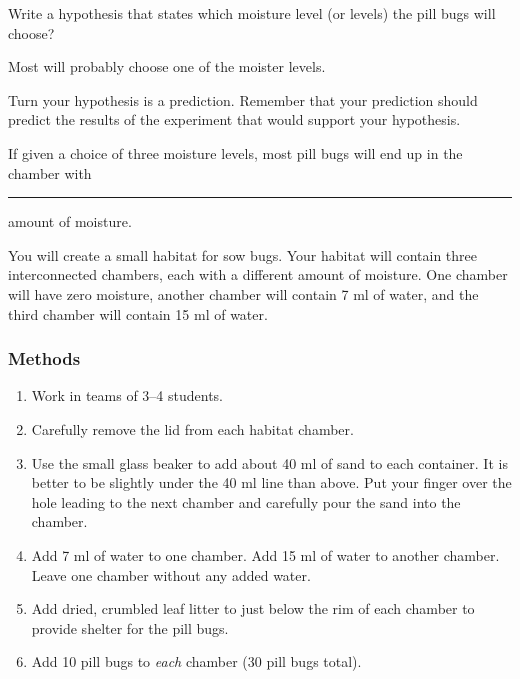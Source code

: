 \documentclass[12pt, hidelinks]{exam}
\newcommand*\AnswerBox[2]{%
    \parbox[t][#1]{0.92\textwidth}{%
    \begin{solution}#2\end{solution}}
    \vspace{\stretch{1}}
}
\newlength{\basespace}
\begin{document}
\begin{questions}

\question \label{ques:hypothesis}
Write a hypothesis that states which moisture level (or levels) the pill bugs will choose?

\AnswerBox{0.35\basespace}{Most will probably choose one of the moister levels.}


\question
Turn your hypothesis is a prediction. Remember that your prediction should predict the results of the experiment that would support your hypothesis. 

\AnswerBox{0.35\basespace}{%
	If given a choice of three moisture levels, most pill bugs will end up in the chamber with \rule{0.75in}{0.4pt} amount of moisture.
}

You will create a small habitat for sow bugs.  Your habitat will contain three interconnected chambers, each with a different amount of moisture.  One chamber will have zero moisture, another chamber will contain 7 ml of water, and the third chamber will contain 15 ml of water.


\subsubsection*{Methods}

\begin{enumerate}
	
	\item Work in teams of 3–4 students.
	
	\item Carefully remove the lid from each habitat chamber. 
	
	\item Use the small glass beaker to add about 40 ml of sand to each container. It is better to be slightly under the 40 ml line than above. Put your finger over the hole leading to the next chamber and carefully pour the sand into the chamber.
	
	\item Add 7 ml of water to one chamber. Add 15 ml of water to another chamber. Leave one chamber without any added water.
	
	\item Add dried, crumbled leaf litter to just below the rim of each chamber to provide shelter for the pill bugs.
	
	\item Add 10 pill bugs to \emph{each} chamber (30 pill bugs total). %
	

\end{enumerate}
\end{questions}
\end{document}
